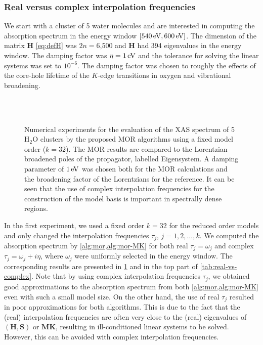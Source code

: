 \subsubsection{Real versus complex interpolation frequencies}
\label{sec:MORresults-points}

We start with a cluster of 5 water molecules and are interested in computing
the absorption spectrum in the energy window $[540\,\mathrm{eV},600\,\mathrm{eV}]$. The
dimension of the matrix $\mathbf{H}$ \cref{eq:defH} was $2n = 6$,500 and $\mathbf{H}$ had
394 eigenvalues in the energy window. The damping factor was $\eta = 1\,\mathrm{eV}$
and the tolerance for solving the linear systems was set to $10^{-6}$. The
damping factor was chosen to roughly  the effects of the core-hole
lifetime of the $K$-edge transitions in oxygen and vibrational
broadening\cite{Stohr_book}. 

\begin{figure}[hbtp]
%
\\[10pt]
%
\\[10pt]
\caption{Numerical experiments for the evaluation of the XAS spectrum of 5 H$_2$O
clusters by the proposed MOR algorithms using a fixed model order ($k = 32$).
The MOR results are compared to the Lorentzian broadened poles of the
propagator, labelled Eigensystem. A damping parameter of $1\,\mathrm{eV}$ was chosen both
for the MOR calculations and the broadening factor of the Lorentzians for the
reference. It can be seen that the use of complex interpolation frequencies
for the construction of the model basis is important in spectrally dense
regions.}
\label{fig:fixed}
\end{figure}

In the first experiment, we used a fixed order $k = 32$ for the reduced order models and only changed the interpolation frequencies $\tau_j$, $j = 1,2,\ldots,k$. We computed the absorption spectrum by \cref{alg:mor,alg:mor-MK} for both real $\tau_j = \omega_j$ and complex $\tau_j = \omega_j + i\eta$, where $\omega_j$ were uniformly selected in the energy window. The corresponding results are presented in \cref{fig:fixed} and in the top part of \cref{tab:real-vs-complex}. Note that by using complex interpolation frequencies $\tau_j$, we obtained  good approximations to the absorption spectrum from both \cref{alg:mor,alg:mor-MK} even with such a small model size. On the other hand, the use of real $\tau_j$ resulted in poor approximations for both algorithms. This is due to the fact that the (real) interpolation frequencies are often very close to the (real) eigenvalues of $(\mathbf{H},\mathbf{S})$ or $\mathbf{M}\mathbf{K}$, resulting in ill-conditioned linear systems to be solved. However, this can be avoided with complex interpolation frequencies.

